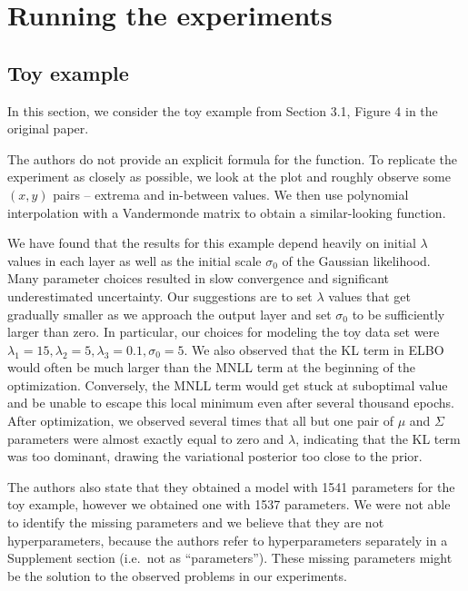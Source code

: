 \documentclass[11pt]{article}
\begin{document}
    \section{Running the experiments}\label{sec:running-the-experiments}

    \subsection{Toy example}
    In this section, we consider the toy example from Section 3.1, Figure 4 in the original paper.

    The authors do not provide an explicit formula for the function.
    To replicate the experiment as closely as possible, we look at the plot and roughly observe some $(x, y)$ pairs -- extrema and in-between values.
    We then use polynomial interpolation with a Vandermonde matrix to obtain a similar-looking function.

    We have found that the results for this example depend heavily on initial $\lambda$ values in each layer as well as the initial scale $\sigma_0$ of the Gaussian likelihood.
    Many parameter choices resulted in slow convergence and significant underestimated uncertainty.
    Our suggestions are to set $\lambda$ values that get gradually smaller as we approach the output layer and set $\sigma_0$ to be sufficiently larger than zero.
    In particular, our choices for modeling the toy data set were $\lambda_1=15, \lambda_2=5,\lambda_3=0.1, \sigma_0=5$.
    We also observed that the KL term in ELBO would often be much larger than the MNLL term at the beginning of the optimization. Conversely, the MNLL term would get stuck at suboptimal value and be unable to escape this local minimum even after several thousand epochs.
    After optimization, we observed several times that all but one pair of $\mu$ and $\Sigma$ parameters were almost exactly equal to zero and $\lambda$, indicating that the KL term was too dominant, drawing the variational posterior too close to the prior.

    The authors also state that they obtained a model with 1541 parameters for the toy example, however we obtained one with 1537 parameters.
    We were not able to identify the missing parameters and we believe that they are not hyperparameters, because the authors refer to hyperparameters separately in a Supplement section (i.e.\ not as ``parameters'').
    These missing parameters might be the solution to the observed problems in our experiments.
\end{document}
